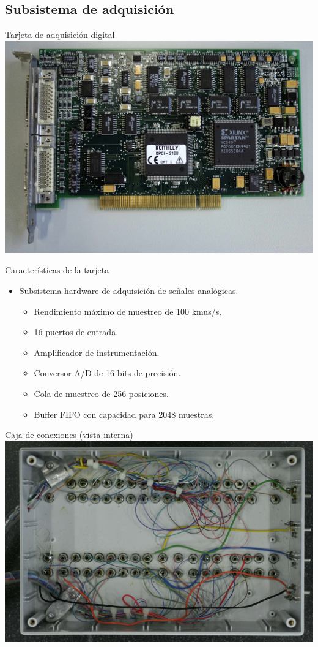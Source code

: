 \documentclass[utf8, compress]			{beamer}
\begin{document}
\subsection{Subsistema de adquisición}

\begin{frame}{Tarjeta de adquisición digital}
    \includegraphics{tarjeta.jpg}
\end{frame}

\begin{frame}{Características de la tarjeta}
    \begin{itemize}
	\item Subsistema hardware de adquisición de señales analógicas.
	    \begin{itemize}
		\item Rendimiento máximo de muestreo de 100 kmus/s.
		\item 16 puertos de entrada.
		\item Amplificador de instrumentación.
		\item Conversor A/D de 16 bits de precisión.
		\item Cola de muestreo de 256 posiciones.
		\item Buffer FIFO con capacidad para 2048 muestras.
	    \end{itemize}
    \end{itemize}
\end{frame}

\begin{frame}{Caja de conexiones (vista interna)}
    \includegraphics{interior.jpg}
\end{frame}
\end{document}
